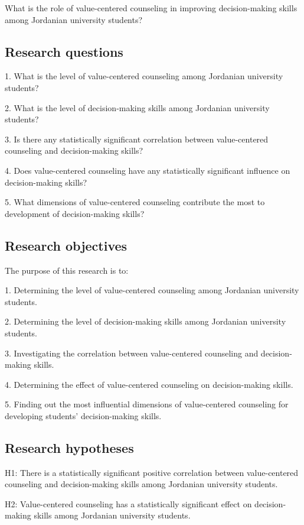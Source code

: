 \documentclass[10pt]{NSP1}
\begin{document}
What is the role of value-centered counseling in improving decision-making skills among Jordanian university students?

\subsection{Research questions}

1. What is the level of value-centered counseling among Jordanian university students?

2. What is the level of decision-making skills among Jordanian university students?

3. Is there any statistically significant correlation between value-centered counseling and decision-making skills?

4. Does value-centered counseling have any statistically significant influence on decision-making skills?

5. What dimensions of value-centered counseling contribute the most to development of decision-making skills?

\subsection{Research objectives}

The purpose of this research is to:

1. Determining the level of value-centered counseling among Jordanian university students.

2. Determining the level of decision-making skills among Jordanian university students.

3. Investigating the correlation between value-centered counseling and decision-making skills.

4. Determining the effect of value-centered counseling on decision-making skills.

5. Finding out the most influential dimensions of value-centered counseling for developing students' decision-making skills.

\subsection{Research hypotheses}

H1: There is a statistically significant positive correlation between value-centered counseling and decision-making skills among Jordanian university students.

H2: Value-centered counseling has a statistically significant effect on decision-making skills among Jordanian university students.
\end{document}
